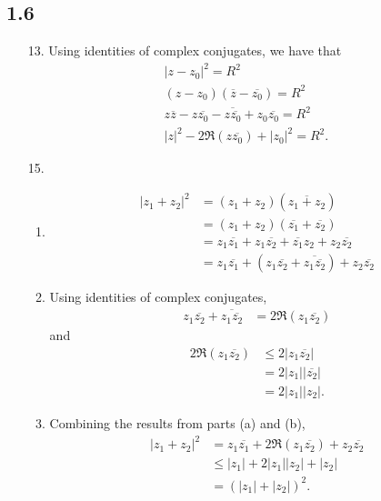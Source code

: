 \documentclass[a4paper,12pt]{article}
\begin{document}
\subsection*{1.6}
\begin{enumerate}
    \item[13.]
        Using identities of complex conjugates, we have that
        \begin{gather*}
            |z - z_0|^2 = R^2 \\
            (z - z_0)(\overline{z} - \overline{z_0}) = R^2 \\
            z \overline{z} - z \overline{z_0} - \overline{z \overline{z_0}} + z_0 \overline{z_0} = R^2 \\
            |z|^2 - 2\Re(z \overline{z_0}) + |z_0|^2 = R^2.
        \end{gather*}

    \item[15.]
        \begin{enumerate}
            \item
                \begin{align*}
                    |z_1 + z_2|^2 &= (z_1 + z_2)(\overline{z_1 + z_2}) \\
                    &= (z_1 + z_2)(\overline{z_1} + \overline{z_2}) \\
                    &= z_1 \overline{z_1} + z_1 \overline{z_2} + \overline{z_1} z_2 + z_2 \overline{z_2} \\
                    &= z_1 \overline{z_1} + (z_1 \overline{z_2} + \overline{z_1 \overline{z_2}}) + z_2 \overline{z_2}
                \end{align*}

            \item
                Using identities of complex conjugates,
                \begin{align*}
                    z_1 \overline{z_2} + \overline{z_1 \overline{z_2}} &= 2\Re(z_1 \overline{z_2})
                \end{align*}
                and
                \begin{align*}
                    2\Re(z_1 \overline{z_2}) &\leq 2|z_1 \overline{z_2}| \\
                    &= 2|z_1||\overline{z_2}| \\
                    &= 2|z_1||z_2|.
                \end{align*}

            \item
                Combining the results from parts (a) and (b),
                \begin{align*}
                    |z_1 + z_2|^2 &= z_1 \overline{z_1} + 2\Re(z_1 \overline{z_2}) + z_2 \overline{z_2} \\
                    &\leq |z_1| + 2|z_1||z_2| + |z_2| \\
                    &= (|z_1| + |z_2|)^2.
                \end{align*}
        \end{enumerate}
\end{enumerate}
\end{document}
